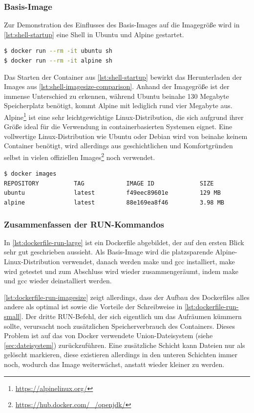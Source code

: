 \subsubsection{Basis-Image}
Zur Demonstration des Einflusses des Basis-Images auf die Imagegröße wird in \cref{lst:shell-startup} eine Shell in Ubuntu und Alpine gestartet.
\begin{lstlisting}[caption=Starten einer Shell in unterschiedlichen Basis-Images, language=bash, label=lst:shell-startup]
$ docker run --rm -it ubuntu sh
$ docker run --rm -it alpine sh
\end{lstlisting}

Das Starten der Container aus \cref{lst:shell-startup} bewirkt das Herunterladen der Images aus \cref{lst:shell-imagesize-comparison}. Anhand der Imagegröße ist der immense Unterschied zu erkennen, während Ubuntu beinahe 130 Megabyte Speicherplatz benötigt, kommt Alpine mit lediglich rund vier Megabyte aus.
Alpine\footnote{\url{https://alpinelinux.org/}} ist eine sehr leichtgewichtige Linux-Distribution, die sich aufgrund ihrer Größe ideal für die Verwendung in containerbasierten Systemen eignet.
Eine vollwertige Linux-Distribution wie Ubuntu oder Debian wird von beinahe keinem Container benötigt, wird allerdings aus geschichtlichen und Komfortgründen selbst in vielen offiziellen Images\footnote{\url{https://hub.docker.com/_/openjdk/}} noch verwendet.
\begin{lstlisting}[caption=Vergleich der Basis-Imagegröße, language=bash, label=lst:shell-imagesize-comparison]
$ docker images
REPOSITORY          TAG            IMAGE ID             SIZE
ubuntu              latest         f49eec89601e         129 MB
alpine              latest         88e169ea8f46         3.98 MB
\end{lstlisting}

\subsubsection{Zusammenfassen der RUN-Kommandos}
In \cref{lst:dockerfile-run-large} ist ein Dockerfile abgebildet, der auf den ersten Blick sehr gut geschrieben aussieht.
Als Basis-Image wird die platzsparende Alpine-Linux-Distribution verwendet, danach werden make und gcc installiert, make wird getestet und zum Abschluss wird wieder zusammengeräumt, indem make und gcc wieder deinstalliert werden.

\cref{lst:dockerfile-run-imagesize} zeigt allerdings, dass der Aufbau des Dockerfiles alles andere als optimal ist sowie die Vorteile der Schreibweise in \cref{lst:dockerfile-run-small}.
Der dritte RUN-Befehl, der sich eigentlich um das Aufräumen kümmern sollte, verursacht noch zusätzlichen Speicherverbrauch des Containers.
Dieses Problem ist auf das von Docker verwendete Union-Dateisystem (siehe \cref{sec:dateisystem}) zurückzuführen.
Eine zusätzliche Schicht kann Dateien nur als gelöscht markieren, diese existieren allerdings in den unteren Schichten immer noch, wodurch das Image weiterwächst, anstatt wieder kleiner zu werden.

